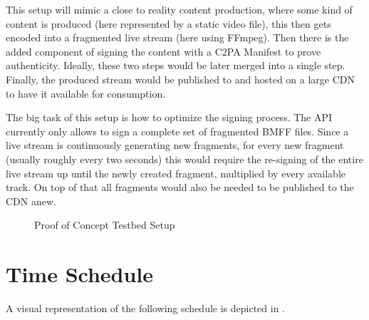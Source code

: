 \documentclass[a4paper]{article}
\begin{document}
This setup will mimic a close to reality content production, where some kind of content is produced (here represented by a static video file), this then gets encoded into a fragmented live stream (here using FFmpeg). Then there is the added component of signing the content with a C2PA Manifest to prove authenticity. Ideally, these two steps would be later merged into a single step. Finally, the produced stream would be published to and hosted on a large CDN to have it available for consumption.

The big task of this setup is how to optimize the signing process. The API currently only allows to sign a complete set of fragmented BMFF files. Since a live stream is continuously generating new fragments, for every new fragment (usually roughly every two seconds) this would require the re-signing of the entire live stream up until the newly created fragment, multiplied by every available track. On top of that all fragments would also be needed to be published to the CDN anew.

\begin{figure}
    \centering
    \caption{Proof of Concept Testbed Setup}
    \label{fig:setup}
\end{figure}

\section{Time Schedule} 

A visual representation of the following schedule is depicted in .
\end{document}
